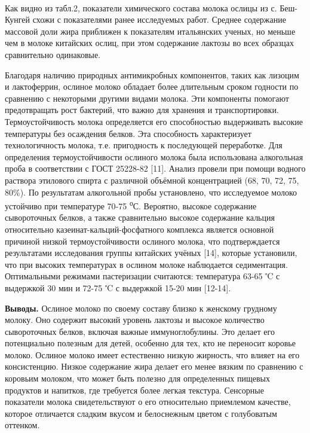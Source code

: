 ~

Как видно из табл.2, показатели химического состава молока ослицы из с.
Беш-Кунгей схожи с показателями ранее исследуемых работ. Среднее
содержание массовой доли жира приближен к показателям итальянских
ученых, но меньше чем в молоке китайских ослиц, при этом содержание
лактозы во всех образцах сравнительно одинаковые.

Благодаря наличию природных антимикробных компонентов, таких как лизоцим
и лактоферрин, ослиное молоко обладает более длительным сроком годности
по сравнению с некоторыми другими видами молока. Эти компоненты помогают
предотвращать рост бактерий, что важно для хранения и транспортировки.
Термоустойчивость молока определяется его способностью выдерживать
высокие температуры без осаждения белков. Эта способность характеризует
технологичность молока, т.е. пригодность к последующей переработке. Для
определения термоустойчивости ослиного молока была использована
алкогольная проба в соответствии с ГОСТ 25228-82 {[}11{]}. Анализ
провели при помощи водного раствора этилового спирта с различной
объёмной концентрацией (68, 70, 72, 75, 80\%). По результатам
алкогольной пробы установлено, что исследуемое молоко устойчиво при
температуре 70-75 \textsuperscript{о}С. Вероятно, высокое содержание
сывороточных белков, а также сравнительно высокое содержание кальция
относительно казеинат-кальций-фосфатного комплекса является основной
причиной низкой термоустойчивости ослиного молока, что подтверждается
результатами исследования группы китайских учёных {[}14{]}, которые
установили, что при высоких температурах в ослином молоке наблюдается
седиментация. Оптимальными режимами пастеризации считаются: температура
63-65 ℃ с выдержкой 30 мин и 72-75 ℃ с выдержкой 15-20 мин {[}12-14{]}.

{\bfseries Выводы.} Ослиное молоко по своему составу близко к женскому
грудному молоку. Оно содержит высокий уровень лактозы и высокое
количество сывороточных белков, включая важные иммуноглобулины. Это
делает его потенциально полезным для детей, особенно для тех, кто не
переносит коровье молоко. Ослиное молоко имеет естественно низкую
жирность, что влияет на его консистенцию. Низкое содержание жира делает
его менее вязким по сравнению с коровьим молоком, что может быть полезно
для определенных пищевых продуктов и напитков, где требуется более
легкая текстура. Сенсорные показатели молока свидетельствуют о его
относительно приемлемом качестве, которое отличается сладким вкусом и
белоснежным цветом с голубоватым оттенком.

